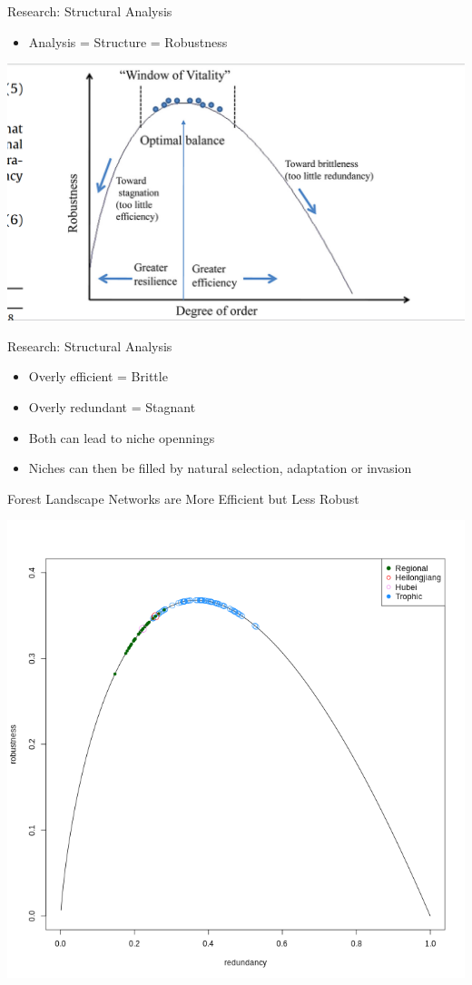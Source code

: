 \documentclass{beamer}
\begin{document}
\begin{frame}{Research: Structural Analysis}

\begin{itemize}
\item
  Analysis = Structure = Robustness
\end{itemize}

\begin{center}\includegraphics[width=0.5\linewidth]{images/Fath_2015_Fig6} \end{center}

\end{frame}

\begin{frame}{Research: Structural Analysis}

\begin{itemize}
\item
  Overly efficient = Brittle
\item
  Overly redundant = Stagnant
\item
  Both can lead to niche opennings
\item
  Niches can then be filled by natural selection, adaptation or invasion
\end{itemize}

\end{frame}

\begin{frame}{Forest Landscape Networks are More Efficient but Less
Robust}

\begin{center}\includegraphics[width=0.5\linewidth]{images/for-rob-red} \end{center}

\end{frame}
\end{document}
